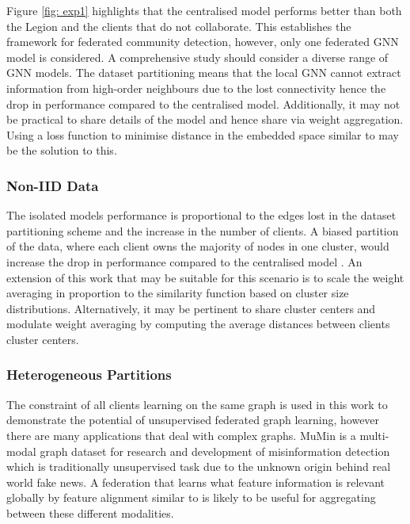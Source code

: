 \documentclass[letterpaper]{article} %
\begin{document}
Figure \ref{fig: exp1} highlights that the centralised model performs better than both the Legion and the clients that do not collaborate. This establishes the framework for federated community detection, however, only one federated GNN model is considered. A comprehensive study should consider a diverse range of GNN models. The dataset partitioning means that the local GNN cannot extract information from high-order neighbours due to the lost connectivity hence the drop in performance compared to the centralised model. Additionally, it may not be practical to share details of the model and hence share via weight aggregation. Using a loss function to minimise distance in the embedded space similar to \citet{makhija2022architecture} may be the solution to this.

\subsubsection*{\textbf{Non-IID Data}}

The isolated models performance is proportional to the edges lost in the dataset partitioning scheme and the increase in the number of clients. A biased partition of the data, where each client owns the majority of nodes in one cluster, would increase the drop in performance compared to the centralised model \cite{ma2022state}. An extension of this work that may be suitable for this scenario is to scale the weight averaging in proportion to the similarity function based on cluster size distributions. Alternatively, it may be pertinent to share cluster centers and modulate weight averaging by computing the average distances between clients cluster centers.


\subsubsection*{\textbf{Heterogeneous Partitions}}

The constraint of all clients learning on the same graph is used in this work to demonstrate the potential of unsupervised federated graph learning, however there are many applications that deal with complex graphs. MuMin \cite{nielsen2022mumin} is a multi-modal graph dataset for research and development of misinformation detection which is traditionally unsupervised task due to the unknown origin behind real world fake news. A federation that learns what feature information is relevant globally by feature alignment similar to \citet{zhuang2021towards} is likely to be useful for aggregating between these different modalities.
\end{document}
